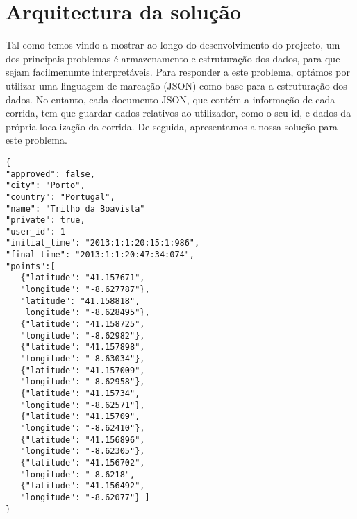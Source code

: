 \documentclass[twocolumn,twoside,10pt,a4paper]{article}
\begin{document}
\section{Arquitectura da solução}
Tal como temos vindo a mostrar ao longo do desenvolvimento do projecto, um dos principais problemas é armazenamento e estruturação dos dados, para que sejam facilmenumte interpretáveis. Para responder a este problema, optámos por utilizar uma linguagem de marcação (JSON) como base para a estruturação dos dados. No entanto, cada documento JSON, que contém a informação de cada corrida, tem que guardar dados relativos ao utilizador, como o seu id, e dados da própria localização da corrida. De seguida, apresentamos a nossa solução para este problema.

\begin{lstlisting}
{
"approved": false,
"city": "Porto",
"country": "Portugal",
"name": "Trilho da Boavista"
"private": true,
"user_id": 1
"initial_time": "2013:1:1:20:15:1:986",
"final_time": "2013:1:1:20:47:34:074",
"points":[
   {"latitude": "41.157671",
   "longitude": "-8.627787"},
   "latitude": "41.158818",
    longitude": "-8.628495"},
   {"latitude": "41.158725",
   "longitude": "-8.62982"},
   {"latitude": "41.157898",
   "longitude": "-8.63034"},
   {"latitude": "41.157009",
   "longitude": "-8.62958"},
   {"latitude": "41.15734",
   "longitude": "-8.62571"},
   {"latitude": "41.15709",
   "longitude": "-8.62410"},
   {"latitude": "41.156896",
   "longitude": "-8.62305"},
   {"latitude": "41.156702",
   "longitude": "-8.6218",
   {"latitude": "41.156492",
   "longitude": "-8.62077"} ]
}
\end{lstlisting}
\end{document}
